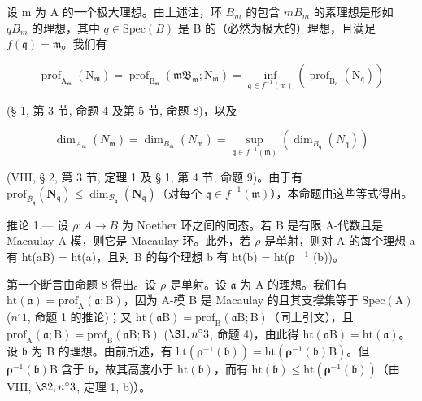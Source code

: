 设 m 为 A 的一个极大理想。由上述注，环 \(B_{m}\) 的包含 \(mB_{m}\) 的素理想是形如 \(qB_{m}\) 的理想，其中 \(q \in \text{Spec}(B)\) 是 B 的（必然为极大的）理想，且满足 \(f(\mathfrak{q}) = \mathfrak{m}\)。我们有

\[
\operatorname{prof} _ {\mathrm{A} _ {\mathfrak {m}}} \left(\mathrm{N} _ {\mathfrak {m}}\right) = \operatorname{prof} _ {\mathrm{B} _ {\mathfrak {m}}} \left(\mathfrak {m B} _ {\mathfrak {m}}; \mathrm{N} _ {\mathfrak {m}}\right) = \inf _ {\mathfrak {q} \in f ^ {- 1} (\mathfrak {m})} \left(\operatorname{prof} _ {\mathrm{B} _ {\mathfrak {q}}} \left(\mathrm{N} _ {\mathfrak {q}}\right)\right)
\]

(§ 1, 第 3 节, 命题 4 及第 5 节, 命题 8)，以及

\[
\dim_ {A _ {\mathfrak {m}}} \left(N _ {\mathfrak {m}}\right) = \dim_ {B _ {\mathfrak {m}}} \left(N _ {\mathfrak {m}}\right) = \sup _ {\mathfrak {q} \in f ^ {- 1} (\mathfrak {m})} \left(\dim_ {B _ {\mathfrak {q}}} \left(N _ {\mathfrak {q}}\right)\right)
\]

(VIII, § 2, 第 3 节, 定理 1 及 § 1, 第 4 节, 命题 9)。由于有 \(\mathrm{prof}_{\mathcal{B}_{\mathfrak{q}}}(\mathbf{N}_{\mathfrak{q}}) \leqslant \dim_{\mathcal{B}_{\mathfrak{q}}}(\mathbf{N}_{\mathfrak{q}})\)（对每个 \(\mathfrak{q} \in f^{-1}(\mathfrak{m})\)），本命题由这些等式得出。

推论 1.--- 设 \(\rho: A \to B\) 为 Noether 环之间的同态。若 B 是有限 A-代数且是 Macaulay A-模，则它是 Macaulay 环。此外，若 \(\rho\) 是单射，则对 A 的每个理想 a 有 ht(aB) = ht(a)，且对 B 的每个理想 b 有 ht(b) = ht(ρ \(^{-1}\) (b))。

第一个断言由命题 8 得出。设 \(\rho\) 是单射。设 \(\mathfrak{a}\) 为 A 的理想。我们有 \(\mathrm{ht}(\mathfrak{a}) = \mathrm{prof}_{\mathrm{A}}(\mathfrak{a};\mathrm{B})\)，因为 A-模 B 是 Macaulay 的且其支撑集等于 \(\mathrm{Spec}(\mathrm{A})\) (\(n^{\circ}1\), 命题 1 的推论)；又 \(\mathrm{ht}(\mathfrak{a}\mathrm{B}) = \mathrm{prof}_{\mathrm{B}}(\mathfrak{a}\mathrm{B};\mathrm{B})\)（同上引文），且 \(\mathrm{prof}_{\mathrm{A}}(\mathfrak{a};\mathrm{B}) = \mathrm{prof}_{\mathrm{B}}(\mathfrak{a}\mathrm{B};\mathrm{B})\) (\(\S 1, n^{\circ}3\), 命题 4)，由此得 \(\mathrm{ht}(\mathfrak{a}\mathrm{B}) = \mathrm{ht}(\mathfrak{a})\)。设 \(\mathfrak{b}\) 为 B 的理想。由前所述，有 \(\mathrm{ht}(\boldsymbol{\rho}^{-1}(\mathfrak{b})) = \mathrm{ht}(\boldsymbol{\rho}^{-1}(\mathfrak{b})\mathrm{B})\)。但 \(\boldsymbol{\rho}^{-1}(\mathfrak{b})\mathrm{B}\) 含于 \(\mathfrak{b}\)，故其高度小于 \(\mathrm{ht}(\mathfrak{b})\)，而有 \(\mathrm{ht}(\mathfrak{b}) \leqslant \mathrm{ht}(\boldsymbol{\rho}^{-1}(\mathfrak{b}))\)（由 VIII, \(\S 2, n^{\circ}3\), 定理 1, b)）。

